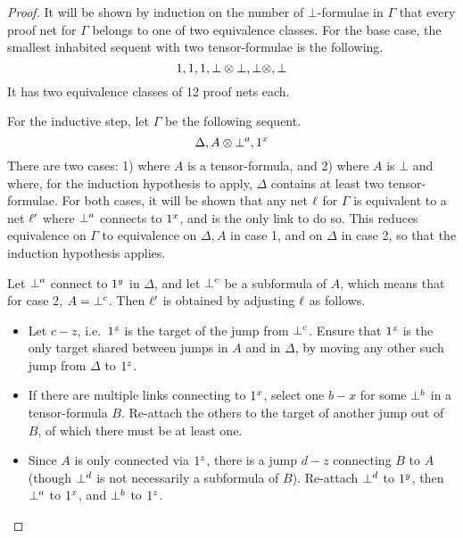 \begin{proof}
%
It will be shown by induction on the number of $\bot$-formulae in $\Gamma$ that every proof net for $\Gamma$ belongs to one of two equivalence classes.
%
For the base case, the smallest inhabited sequent with two tensor-formulae is the following.
\[
	\1,\1,\1,\bot\tn\bot,\bot\tn,\bot
\]
It has two equivalence classes of 12 proof nets each.



For the inductive step, let $\Gamma$ be the following sequent.
\[
	\Delta,A\tn\named a\bot,\named x\1
\]
There are two cases: 1) where $A$ is a tensor-formula, and 2) where $A$ is $\bot$ and where, for the induction hypothesis to apply, $\Delta$ contains at least two tensor-formulae.
%
For both cases, it will be shown that any net $\links$ for $\Gamma$ is equivalent to a net $\links'$ where $\named a\bot$ connects to $\named x1$, and is the only link to do so.
%
This reduces equivalence on $\Gamma$ to equivalence on $\Delta,A$ in case 1, and on $\Delta$ in case 2, so that the induction hypothesis applies.


Let $\named a\bot$ connect to $\named y\1$ in $\Delta$, and let $\named c\bot$ be a subformula of $A$, which means that for case 2, $A=\named c\bot$.
%
Then $\links'$ is obtained by adjusting $\links$ as follows.
\begin{itemize}

	\item
Let $c-z$, i.e.\ $\named z\1$ is the target of the jump from $\named c\bot$.	
%
Ensure that $\named z\1$ is the only target shared between jumps in $A$ and in $\Delta$, by moving any other such jump from $\Delta$ to $\named z\1$.

	\item
If there are multiple links connecting to $\named x\1$, select one $b-x$ for some $\named b\bot$ in a tensor-formula $B$.
%
Re-attach the others to the target of another jump out of $B$, of which there must be at least one.

	\item
Since $A$ is only connected via $\named z\1$, there is a jump $d-z$ connecting $B$ to $A$ (though $\named d\bot$ is not necessarily a subformula of $B$).
%
Re-attach $\named d\bot$ to $\named y\1$, then $\named a\bot$ to $\named x\1$, and $\named b\bot$ to $\named z\1$.

\end{itemize}

\end{proof}



